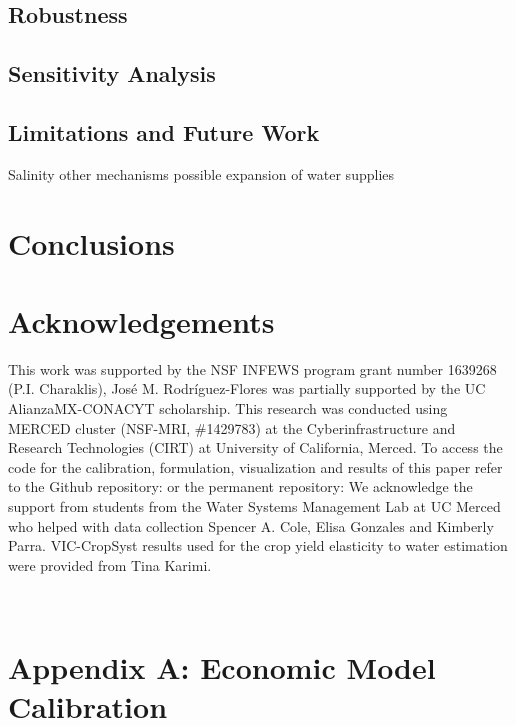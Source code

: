 \documentclass[11pt,a4paper]{article}
\begin{document}
\subsection{Robustness}

\subsection{Sensitivity Analysis}

\subsection{Limitations and Future Work}

Salinity other mechanisms possible expansion of water supplies 

\section{Conclusions}

\section{Acknowledgements}
This work was supported by the NSF INFEWS program grant number 1639268 (P.I. Charaklis), José M. Rodríguez-Flores was partially supported by the UC AlianzaMX-CONACYT scholarship. This research was conducted using MERCED cluster (NSF-MRI, \#1429783) at the Cyberinfrastructure and Research Technologies (CIRT) at University of California, Merced. To access the code for the calibration, formulation, visualization and results of this paper refer to the Github repository: or the permanent repository: We acknowledge the support from students from the Water Systems Management Lab at UC Merced who helped with data collection Spencer A. Cole, Elisa Gonzales and Kimberly Parra. VIC-CropSyst results used for the crop yield elasticity to water estimation were provided from Tina Karimi.  

\appendix
\renewcommand\thefigure{\thesection.\arabic{figure}} 
\setcounter{figure}{0}  
\renewcommand{\theequation}{\thesection.\arabic{equation}}\
\setcounter{equation}{0} 
\renewcommand{\thetable}{\thesection.\arabic{table}}\
\setcounter{table}{0} 

\section{Appendix A: Economic Model Calibration}
\end{document}

